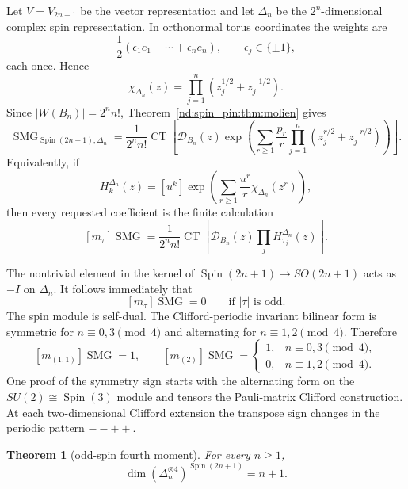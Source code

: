 \documentclass[10pt]{article}
\newcommand{\CT}{\operatorname{CT}}
\newcommand{\SMG}{\operatorname{SMG}}
\newcommand{\MGF}{\SMG}
\newtheorem{theorem}{Theorem}
\begin{document}
Let $V=V_{2n+1}$ be the vector representation and let $\Delta_n$ be the
$2^n$-dimensional complex spin representation.  In orthonormal torus
coordinates the weights are
\[
 \frac12(\epsilon_1e_1+\cdots+\epsilon_ne_n),
 \qquad \epsilon_j\in\{\pm1\},
\]
each once.  Hence
\begin{equation}\label{nd:spin_pin:eq:b-character}
 \chi_{\Delta_n}(z)=\prod_{j=1}^n(z_j^{1/2}+z_j^{-1/2}).
\end{equation}
Since $|W(B_n)|=2^nn!$, Theorem~\ref{nd:spin_pin:thm:molien} gives
\begin{equation}\label{nd:spin_pin:eq:b-mgf}
 \boxed{\MGF_{\operatorname{Spin}(2n+1),\Delta_n}
 =\frac1{2^nn!}\CT\!\left[\mathcal D_{B_n}(z)
 \exp\!\left(\sum_{r\ge1}\frac{p_r}{r}
 \prod_{j=1}^n(z_j^{r/2}+z_j^{-r/2})\right)\right].}
\end{equation}
Equivalently, if
\[
 H_k^{\Delta_n}(z)=[u^k]\exp\!\left(
 \sum_{r\ge1}\frac{u^r}{r}\chi_{\Delta_n}(z^r)\right),
\]
then every requested coefficient is the finite calculation
\begin{equation}\label{nd:spin_pin:eq:b-coeff}
 [m_\tau]\MGF
 =\frac1{2^nn!}\CT\!\left[
 \mathcal D_{B_n}(z)\prod_jH_{\tau_j}^{\Delta_n}(z)\right].
\end{equation}

The nontrivial element in the kernel of
$\operatorname{Spin}(2n+1)\to SO(2n+1)$ acts as $-I$ on $\Delta_n$.
It follows immediately that
\begin{equation}\label{nd:spin_pin:eq:b-parity}
 [m_\tau]\MGF=0\qquad\text{if $|\tau|$ is odd}.
\end{equation}
The spin module is self-dual.  The Clifford-periodic invariant bilinear form
is symmetric for $n\equiv0,3\pmod4$ and alternating for
$n\equiv1,2\pmod4$.  Therefore
\begin{equation}\label{nd:spin_pin:eq:b-quadratic}
 [m_{(1,1)}]\MGF=1,
 \qquad
 [m_{(2)}]\MGF=\begin{cases}
 1,&n\equiv0,3\pmod4,\\0,&n\equiv1,2\pmod4.
 \end{cases}
\end{equation}
One proof of the symmetry sign starts with the alternating form on the
$SU(2)\cong\operatorname{Spin}(3)$ module and tensors the Pauli-matrix
Clifford construction.  At each two-dimensional Clifford extension the
transpose sign changes in the periodic pattern $--++$.

\begin{theorem}[odd-spin fourth moment]\label{nd:spin_pin:thm:b-fourth}
For every $n\ge1$,
\begin{equation}\label{nd:spin_pin:eq:b-fourth}
 \boxed{\dim(\Delta_n^{\otimes4})^{\operatorname{Spin}(2n+1)}=n+1.}
\end{equation}
\end{theorem}
\end{document}
